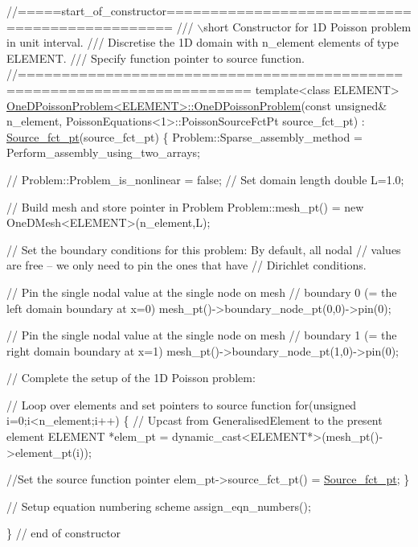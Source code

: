 \begin{DoxyCodeInclude}
\textcolor{comment}{//=====start\_of\_constructor===============================================}
\textcolor{comment}{/// \(\backslash\)short Constructor for 1D Poisson problem in unit interval.}
\textcolor{comment}{}\textcolor{comment}{/// Discretise the 1D domain with n\_element elements of type ELEMENT.}
\textcolor{comment}{}\textcolor{comment}{/// Specify function pointer to source function. }
\textcolor{comment}{}\textcolor{comment}{//========================================================================}
\textcolor{keyword}{template}<\textcolor{keyword}{class} ELEMENT>
\hyperlink{classOneDPoissonProblem_ab814af5dfd3b7ae665cd20e27da5d9ae}{OneDPoissonProblem<ELEMENT>::OneDPoissonProblem}(\textcolor{keyword}{const} \textcolor{keywordtype}{
      unsigned}& n\_element,
 PoissonEquations<1>::PoissonSourceFctPt source\_fct\_pt) : 
 \hyperlink{classOneDPoissonProblem_a5fdff4b9218f56dec7fbc282f2428eef}{Source\_fct\_pt}(source\_fct\_pt)
\{ 
 Problem::Sparse\_assembly\_method = Perform\_assembly\_using\_two\_arrays;

\textcolor{comment}{// Problem::Problem\_is\_nonlinear = false;}
 \textcolor{comment}{// Set domain length }
 \textcolor{keywordtype}{double} L=1.0;

 \textcolor{comment}{// Build mesh and store pointer in Problem}
 Problem::mesh\_pt() = \textcolor{keyword}{new} OneDMesh<ELEMENT>(n\_element,L);

 \textcolor{comment}{// Set the boundary conditions for this problem: By default, all nodal}
 \textcolor{comment}{// values are free -- we only need to pin the ones that have }
 \textcolor{comment}{// Dirichlet conditions. }

 \textcolor{comment}{// Pin the single nodal value at the single node on mesh }
 \textcolor{comment}{// boundary 0 (= the left domain boundary at x=0)}
 mesh\_pt()->boundary\_node\_pt(0,0)->pin(0);
 
 \textcolor{comment}{// Pin the single nodal value at the single node on mesh }
 \textcolor{comment}{// boundary 1 (= the right domain boundary at x=1)}
 mesh\_pt()->boundary\_node\_pt(1,0)->pin(0);

 \textcolor{comment}{// Complete the setup of the 1D Poisson problem:}

 \textcolor{comment}{// Loop over elements and set pointers to source function}
 \textcolor{keywordflow}{for}(\textcolor{keywordtype}{unsigned} i=0;i<n\_element;i++)
  \{
   \textcolor{comment}{// Upcast from GeneralisedElement to the present element}
   ELEMENT *elem\_pt = \textcolor{keyword}{dynamic\_cast<}ELEMENT*\textcolor{keyword}{>}(mesh\_pt()->element\_pt(i));
   
   \textcolor{comment}{//Set the source function pointer}
   elem\_pt->source\_fct\_pt() = \hyperlink{classOneDPoissonProblem_a5fdff4b9218f56dec7fbc282f2428eef}{Source\_fct\_pt};
  \}

 \textcolor{comment}{// Setup equation numbering scheme}
 assign\_eqn\_numbers();

\} \textcolor{comment}{// end of constructor}

\end{DoxyCodeInclude}


